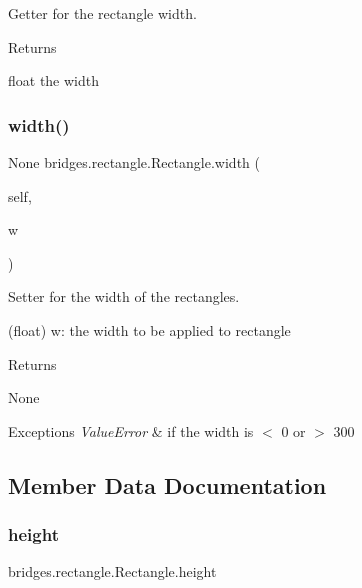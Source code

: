Getter for the rectangle width. 

\begin{DoxyReturn}{Returns}


float the width 
\end{DoxyReturn}
\mbox{\label{classbridges_1_1rectangle_1_1_rectangle_a700c6c37ad4b1da06891656401313481}} 
\subsubsection{\texorpdfstring{width()}{width()}\hspace{0.1cm}{\footnotesize\ttfamily [2/2]}}
{\footnotesize\ttfamily  None bridges.\+rectangle.\+Rectangle.\+width (\begin{DoxyParamCaption}\item[{}]{self,  }\item[{}]{w }\end{DoxyParamCaption})}



Setter for the width of the rectangles. 

\begin{DoxyVerb}       (float) w: the width to be applied to rectangle
\end{DoxyVerb}
 \begin{DoxyReturn}{Returns}


None
\end{DoxyReturn}

\begin{DoxyExceptions}{Exceptions}
{\em Value\+Error} & if the width is $<$ 0 or $>$ 300 \\
\hline
\end{DoxyExceptions}


\subsection{Member Data Documentation}
\mbox{\label{classbridges_1_1rectangle_1_1_rectangle_a3b7a2448881d5eea95e86aac8dfae467}} 
\subsubsection{\texorpdfstring{height}{height}}
{\footnotesize\ttfamily bridges.\+rectangle.\+Rectangle.\+height}

